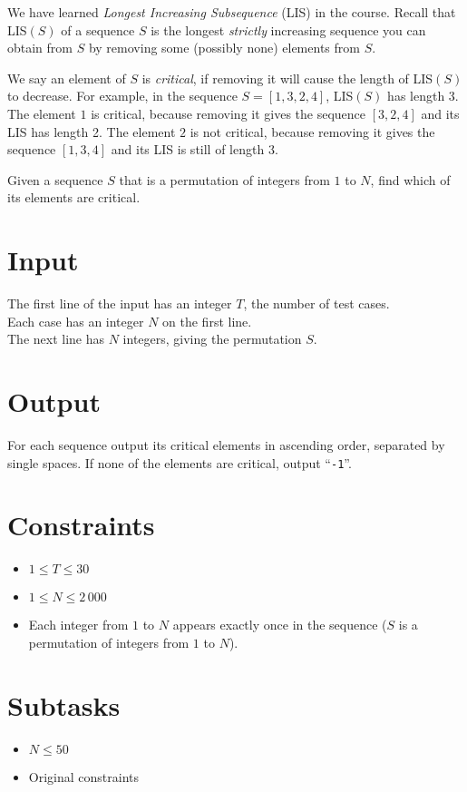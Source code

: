 
We have learned {\it Longest Increasing Subsequence} (LIS) in the course.
Recall that LIS$(S)$ of a sequence $S$ is the longest {\it strictly} increasing sequence you can obtain from $S$ by removing some (possibly none) elements from $S$.

We say an element of $S$ is {\it critical}, if removing it will cause the length of LIS$(S)$ to decrease.
For example, in the sequence $S = [1, 3, 2, 4]$, LIS$(S)$ has length 3.
The element $1$ is critical, because removing it gives the sequence $[3, 2, 4]$ and its LIS has length 2.
The element $2$ is not critical, because removing it gives the sequence $[1, 3, 4]$ and its LIS is still of length 3.

Given a sequence $S$ that is a permutation of integers from $1$ to $N$, find which of its elements are critical.
\section*{Input}

The first line of the input has an integer $T$, the number of test cases.\\
Each case has an integer $N$ on the first line.\\
The next line has $N$ integers, giving the permutation $S$.

\section*{Output}
For each sequence output its critical elements in ascending order, separated by single spaces. If none of the elements are critical, output ``{\tt -1}''.

\section*{Constraints}
\begin{itemize}
\item $1 \leq T\leq 30$
\item $1 \leq N \leq 2\,000$
\item Each integer from $1$ to $N$ appears exactly once in the sequence ($S$ is a permutation of integers from $1$ to $N$).
\end{itemize}

\section*{Subtasks}
\begin{itemize}
  \item $N \leq 50$
  \item Original constraints
\end{itemize}
